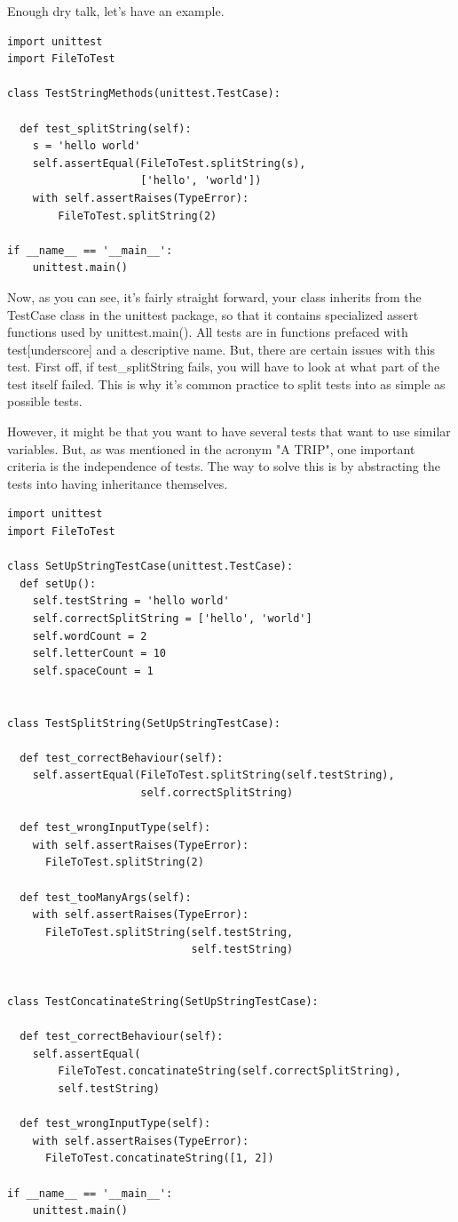 \documentclass[10pt,a4paper]{article}
\begin{document}
Enough dry talk, let's have an example.

\begin{lstlisting}
import unittest
import FileToTest

class TestStringMethods(unittest.TestCase):

  def test_splitString(self):
    s = 'hello world'
    self.assertEqual(FileToTest.splitString(s), 
                     ['hello', 'world'])
    with self.assertRaises(TypeError):
        FileToTest.splitString(2)

if __name__ == '__main__':
    unittest.main()

\end{lstlisting}

Now, as you can see, it's fairly straight forward, your class inherits from the TestCase class in the unittest package, so that it contains specialized assert functions used by unittest.main(). All tests are in functions prefaced with test[underscore] and a descriptive name. But, there are certain issues with this test. 
First off, if test\_splitString fails, you will have to look at what part of the test itself failed. This is why it's common practice to split tests into as simple as possible tests. 

However, it might be that you want to have several tests that want to use similar variables. But, as was mentioned in the acronym "A TRIP", one important criteria is the independence of tests. The way to solve this is by abstracting the tests into having inheritance themselves.

\begin{lstlisting}
import unittest
import FileToTest 

class SetUpStringTestCase(unittest.TestCase):
  def setUp():
    self.testString = 'hello world'
    self.correctSplitString = ['hello', 'world']
    self.wordCount = 2
    self.letterCount = 10
    self.spaceCount = 1


class TestSplitString(SetUpStringTestCase):

  def test_correctBehaviour(self):
    self.assertEqual(FileToTest.splitString(self.testString), 
                     self.correctSplitString)

  def test_wrongInputType(self):
    with self.assertRaises(TypeError):
      FileToTest.splitString(2)

  def test_tooManyArgs(self):
    with self.assertRaises(TypeError):
      FileToTest.splitString(self.testString, 
                             self.testString)


class TestConcatinateString(SetUpStringTestCase):

  def test_correctBehaviour(self):
    self.assertEqual(
        FileToTest.concatinateString(self.correctSplitString), 
        self.testString)

  def test_wrongInputType(self):
    with self.assertRaises(TypeError):
      FileToTest.concatinateString([1, 2])
          
if __name__ == '__main__':
    unittest.main()

\end{lstlisting}
\end{document}
